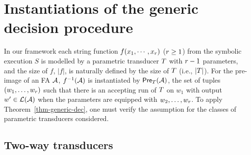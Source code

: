 
\section{Instantiations of the generic decision procedure}\label{sec-instan}

In our framework
each string function $f(x_1, \cdots, x_r)$ ($r\geq 1$) from the symbolic execution $S$ is modelled by a parametric transducer $T$  
with $r-1$ parameters, and the size of $f$, $|f|$, is naturally defined by the size of $T$ (i.e., $|T|$). 
For the pre-image of an FA $\mathcal{A}$,  %
$f^{-1}(\mathcal{A})$ is instantiated by $\textsf{Pre}_{T}(\mathcal{A})$, the set of tuples $(w_1,\ldots, w_r)$ such that there is an accepting run of $T$ on $w_1$ with output $w'\in \mathcal{L}(\mathcal{A})$ when the parameters are equipped with $w_2,\ldots, w_r$. To apply Theorem~\ref{thm-generic-dec}, one must verify the \prerec{} assumption for the classes of parametric transducers considered. 



 
\subsection{Two-way transducers}\label{sec-2way}



